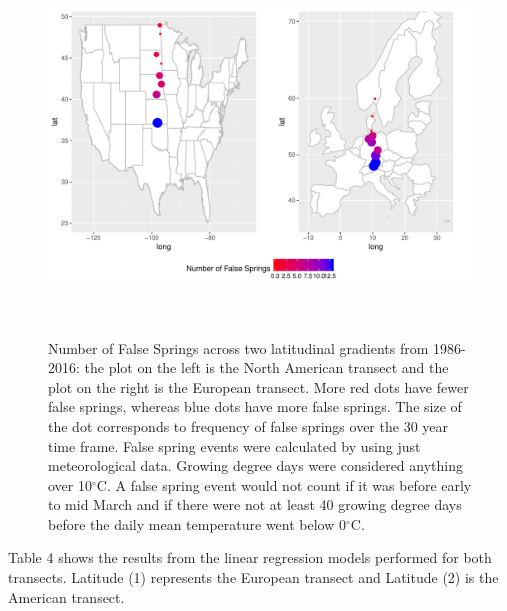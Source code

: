 \documentclass{article}\usepackage[]{graphicx}\usepackage[]{color}
\begin{document}
\begin{figure} [H]
\begin{center}
\caption{Number of False Springs across two latitudinal gradients from 1986-2016: the plot on the left is the North American transect and the plot on the right is the European transect. More red dots have fewer false springs, whereas blue dots have more false springs. The size of the dot corresponds to frequency of false springs over the 30 year time frame. False spring events were calculated by using just meteorological data. Growing degree days were considered anything over 10$^{\circ}$C. A false spring event would not count if it was before early to mid March and if there were not at least 40 growing degree days before the daily mean temperature went below 0$^{\circ}$C.}
\includegraphics[width=18cm, height=10cm]{..//figure/lat.pdf} %
\end{center}
\end{figure}

Table 4 shows the results from the linear regression models performed for both transects. Latitude (1) represents the European transect and Latitude (2) is the American transect. 
\end{document}

